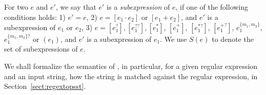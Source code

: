 For two {\regexp} $e$ and $e'$, we say that $e'$ is a \emph{subexpression} of $e$,
if one of the following conditions holds: 1) $e'=e$, 2) $e = [e_1 \cdot e_2]$ or $[e_1 + e_2]$, and $e'$ is a subexpression of $e_1$ or $e_2$, 3) $e = [e_1^?], [e_1^{??}], [e_1^{\ast}]$, $[e_1^{+}]$, $[e_1^{\ast?}]$, $[e_1^{+?}]$, $e_1^{\{m_1, m_2\}}$, $e_1^{\{m_1, m_2\}?}$ or $( e_1)$, and $e'$ is a subexpression of $e_1$. We use $S(e)$ to denote the set of subexpressions of $e$. %

% 

We shall formalize the semantics of \regexp, in particular, for a given regular expression and an input string, how the string is matched against the regular expression, in Section~\ref{sect:regextopsst}.


